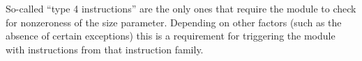 \saNote{}
So-called ``type 4 \mxpMod{} instructions'' are the only ones that require the \mxpMod{} module to check for nonzeroness of the size parameter.
Depending on other factors (such as the absence of certain exceptions) this is a requirement for triggering the \mmuMod{} module with instructions from that instruction family.
